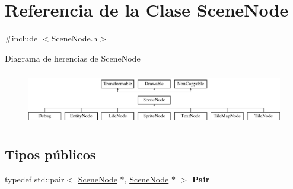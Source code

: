 \hypertarget{classSceneNode}{}\section{Referencia de la Clase Scene\+Node}
\label{classSceneNode}


{\ttfamily \#include $<$Scene\+Node.\+h$>$}

Diagrama de herencias de Scene\+Node\begin{figure}[H]
\begin{center}
\leavevmode
\includegraphics[height=2.376238cm]{classSceneNode}
\end{center}
\end{figure}
\subsection*{Tipos públicos}
\begin{DoxyCompactItemize}
\item 
\hypertarget{classSceneNode_a366efca54698fa3f6eaf80b41e7ff4df}{}typedef std\+::pair$<$ \hyperlink{classSceneNode}{Scene\+Node} $\ast$, \hyperlink{classSceneNode}{Scene\+Node} $\ast$ $>$ {\bfseries Pair}\label{classSceneNode_a366efca54698fa3f6eaf80b41e7ff4df}

\end{DoxyCompactItemize}
